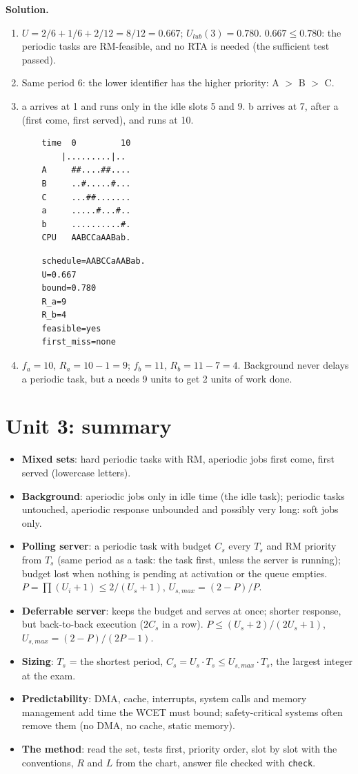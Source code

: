 \textbf{Solution.}
\begin{enumerate}
    \item $U = 2/6 + 1/6 + 2/12 = 8/12 = 0.667$; $U_{lub}(3) = 0.780$. $0.667 \le 0.780$: the periodic tasks are RM-feasible, and no RTA is needed (the sufficient test passed).
    \item Same period 6: the lower identifier has the higher priority: A $>$ B $>$ C.
    \item a arrives at 1 and runs only in the idle slots 5 and 9. b arrives at 7, after a (first come, first served), and runs at 10.
\begin{verbatim}
    time  0         10
        |.........|..
    A     ##....##....
    B     ..#.....#...
    C     ...##.......
    a     .....#...#..
    b     ..........#.
    CPU   AABCCaAABab.
\end{verbatim}

\begin{verbatim}
    schedule=AABCCaAABab.
    U=0.667
    bound=0.780
    R_a=9
    R_b=4
    feasible=yes
    first_miss=none
\end{verbatim}
    \item $f_a = 10$, $R_a = 10 - 1 = 9$; $f_b = 11$, $R_b = 11 - 7 = 4$. Background never delays a periodic task, but a needs 9 units to get 2 units of work done.
\end{enumerate}

\section{Unit 3: summary}
\begin{itemize}
    \item \textbf{Mixed sets}: hard periodic tasks with RM, aperiodic jobs first come, first served (lowercase letters).
    \item \textbf{Background}: aperiodic jobs only in idle time (the idle task); periodic tasks untouched, aperiodic response unbounded and possibly very long: soft jobs only.
    \item \textbf{Polling server}: a periodic task with budget $C_s$ every $T_s$ and RM priority from $T_s$ (same period as a task: the task first, unless the server is running); budget lost when nothing is pending at activation or the queue empties. $P = \prod (U_i + 1) \le 2/(U_s + 1)$, $U_{s,max} = (2 - P)/P$.
    \item \textbf{Deferrable server}: keeps the budget and serves at once; shorter response, but back-to-back execution ($2C_s$ in a row). $P \le (U_s + 2)/(2U_s + 1)$, $U_{s,max} = (2 - P)/(2P - 1)$.
    \item \textbf{Sizing}: $T_s$ = the shortest period, $C_s = U_s \cdot T_s \le U_{s,max} \cdot T_s$, the largest integer at the exam.
    \item \textbf{Predictability}: DMA, cache, interrupts, system calls and memory management add time the WCET must bound; safety-critical systems often remove them (no DMA, no cache, static memory).
    \item \textbf{The method}: read the set, tests first, priority order, slot by slot with the conventions, $R$ and $L$ from the chart, answer file checked with \texttt{check}.
\end{itemize}


